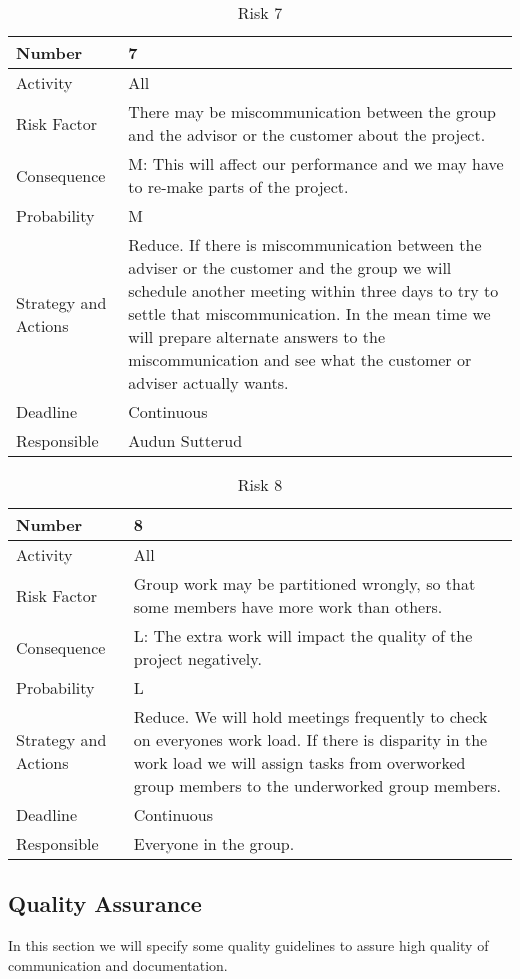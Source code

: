 \documentclass[../document.tex]{subfiles}
\begin{document}
\begin{table}[H]
\caption{Risk 7}
\begin{tabularx}{\textwidth}{|l|X|}
\hline
Number
&7
\\ \hline Activity
&All
\\ \hline Risk Factor
&There may be miscommunication between the group and the advisor or the customer about the project.
\\ \hline Consequence
&M: This will affect our performance and we may have to re-make parts of the project.
\\ \hline Probability
&M
\\ \hline Strategy and Actions
&Reduce. If there is miscommunication between the adviser or the customer and the group we will schedule another meeting within three days to try to settle that miscommunication. In the mean time we will prepare alternate answers to the miscommunication and see what the customer or adviser actually wants.
\\ \hline Deadline
&Continuous
\\ \hline Responsible
&Audun Sutterud
\\ \hline 
\end{tabularx}
\end{table}

\begin{table}[H]
\caption{Risk 8}
\begin{tabularx}{\textwidth}{|l|X|}
\hline
Number
&8
\\ \hline Activity
&All
\\ \hline Risk Factor
&Group work may be partitioned wrongly, so that some members have more work than others.
\\ \hline Consequence
&L: The extra work will impact the quality of the project negatively.
\\ \hline Probability
&L
\\ \hline Strategy and Actions
&Reduce. We will hold meetings frequently to check on everyones work load. If there is disparity in the work load we will assign tasks from overworked group members to the underworked group members.
\\ \hline Deadline
&Continuous
\\ \hline Responsible
&Everyone in the group.
\\ \hline 
\end{tabularx}
\end{table}

\subsection{Quality Assurance}
In this section we will specify some quality guidelines to assure high quality of communication and documentation.
\end{document}
